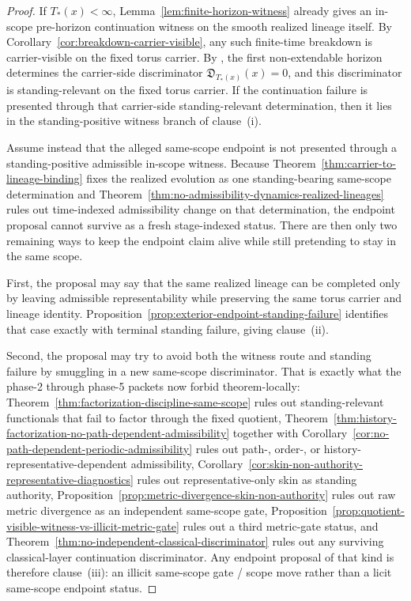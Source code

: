 \begin{proof}
If $T_*(x)<\infty$, Lemma~\ref{lem:finite-horizon-witness} already gives an in-scope pre-horizon continuation witness on the smooth realized lineage itself. By Corollary~\ref{cor:breakdown-carrier-visible}, any such finite-time breakdown is carrier-visible on the fixed torus carrier. By \HorizonDetectabilityRef{}, the first non-extendable horizon determines the carrier-side discriminator $\mathfrak D_{T_*(x)}(x)=0$, and this discriminator is standing-relevant on the fixed torus carrier. If the continuation failure is presented through that carrier-side standing-relevant determination, then it lies in the standing-positive witness branch of clause~(i).

Assume instead that the alleged same-scope endpoint is not presented through a standing-positive admissible in-scope witness. Because Theorem~\ref{thm:carrier-to-lineage-binding} fixes the realized evolution as one standing-bearing same-scope determination and Theorem~\ref{thm:no-admissibility-dynamics-realized-lineages} rules out time-indexed admissibility change on that determination, the endpoint proposal cannot survive as a fresh stage-indexed status. There are then only two remaining ways to keep the endpoint claim alive while still pretending to stay in the same scope.

First, the proposal may say that the same realized lineage can be completed only by leaving admissible representability while preserving the same torus carrier and lineage identity. Proposition~\ref{prop:exterior-endpoint-standing-failure} identifies that case exactly with terminal standing failure, giving clause~(ii).

Second, the proposal may try to avoid both the witness route and standing failure by smuggling in a new same-scope discriminator. That is exactly what the phase-2 through phase-5 packets now forbid theorem-locally: Theorem~\ref{thm:factorization-discipline-same-scope} rules out standing-relevant functionals that fail to factor through the fixed quotient, Theorem~\ref{thm:history-factorization-no-path-dependent-admissibility} together with Corollary~\ref{cor:no-path-dependent-periodic-admissibility} rules out path-, order-, or history-representative-dependent admissibility, Corollary~\ref{cor:skin-non-authority-representative-diagnostics} rules out representative-only skin as standing authority, Proposition~\ref{prop:metric-divergence-skin-non-authority} rules out raw metric divergence as an independent same-scope gate, Proposition~\ref{prop:quotient-visible-witness-vs-illicit-metric-gate} rules out a third metric-gate status, and Theorem~\ref{thm:no-independent-classical-discriminator} rules out any surviving classical-layer continuation discriminator. Any endpoint proposal of that kind is therefore clause~(iii): an illicit same-scope gate / scope move rather than a licit same-scope endpoint status.


\end{proof}
